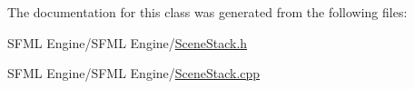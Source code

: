 The documentation for this class was generated from the following files\+:\begin{DoxyCompactItemize}
\item 
S\+F\+M\+L Engine/\+S\+F\+M\+L Engine/\hyperlink{_scene_stack_8h}{Scene\+Stack.\+h}\item 
S\+F\+M\+L Engine/\+S\+F\+M\+L Engine/\hyperlink{_scene_stack_8cpp}{Scene\+Stack.\+cpp}\end{DoxyCompactItemize}
